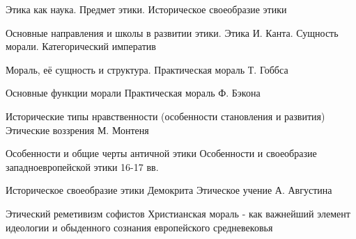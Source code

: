 \documentclass[
	14pt,
	a4paper,
	]
	{scrartcl}
\begin{document}
\shapk
{}
\setcounter{zad}{0}

\vfill
\z Этика как наука. Предмет этики.
 \vfill
\z Историческое своеобразие этики \vfill

\vfill

\newpage


\shapk
{}
\setcounter{zad}{0}

\vfill
\z Основные направления и школы в развитии этики.
 \vfill
\z Этика И. Канта. Сущность морали. Категорический императив
 \vfill

\vfill

\newpage


\shapk
{}
\setcounter{zad}{0}

\vfill
\z Мораль, её сущность и структура.
 \vfill
\z Практическая мораль Т. Гоббса
 \vfill

\vfill

\newpage


\shapk
{}
\setcounter{zad}{0}

\vfill
\z Основные функции морали
 \vfill
\z Практическая мораль Ф. Бэкона
 \vfill

\vfill

\newpage


\shapk
{}
\setcounter{zad}{0}

\vfill
\z Исторические типы нравственности (особенности становления и развития) 
 \vfill
\z Этические воззрения М. Монтеня
 \vfill

\vfill

\newpage


\shapk
{}
\setcounter{zad}{0}

\vfill
\z Особенности и общие черты античной этики
 \vfill
\z Особенности и своеобразие западноевропейской этики 16-17 вв.
 \vfill

\vfill

\newpage


\shapk
{}
\setcounter{zad}{0}

\vfill
\z Историческое своеобразие этики Демокрита
 \vfill
\z Этическое учение А. Августина
 \vfill

\vfill

\newpage


\shapk
{}
\setcounter{zad}{0}

\vfill
\z Этический реметивизм софистов
 \vfill
\z Христианская мораль - как важнейший элемент идеологии и обыденного сознания европейского средневековья
 \vfill
\end{document}
